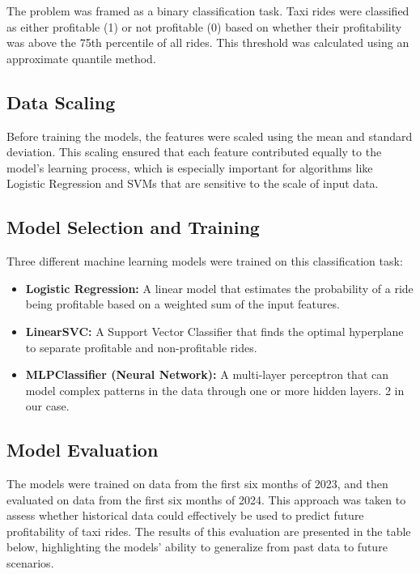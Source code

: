\documentclass[11pt]{article}
\begin{document}
The problem was framed as a binary classification task. Taxi rides were classified as either profitable (1) or not profitable (0) based on whether their profitability was above the 75th percentile of all rides. This threshold was calculated using an approximate quantile method.

\subsection{Data Scaling}

Before training the models, the features were scaled using the mean and standard deviation. This scaling ensured that each feature contributed equally to the model's learning process, which is especially important for algorithms like Logistic Regression and SVMs that are sensitive to the scale of input data.

\subsection{Model Selection and Training}

Three different machine learning models were trained on this classification task:

\begin{itemize}
    \item \textbf{Logistic Regression:} A linear model that estimates the probability of a ride being profitable based on a weighted sum of the input features.
    \item \textbf{LinearSVC:} A Support Vector Classifier that finds the optimal hyperplane to separate profitable and non-profitable rides.
    \item \textbf{MLPClassifier (Neural Network):} A multi-layer perceptron that can model complex patterns in the data through one or more hidden layers. 2 in our case.
\end{itemize}

\subsection{Model Evaluation}

The models were trained on data from the first six months of 2023, and then evaluated on data from the first six months of 2024. This approach was taken to assess whether historical data could effectively be used to predict future profitability of taxi rides. The results of this evaluation are presented in the table below, highlighting the models' ability to generalize from past data to future scenarios.
\end{document}
